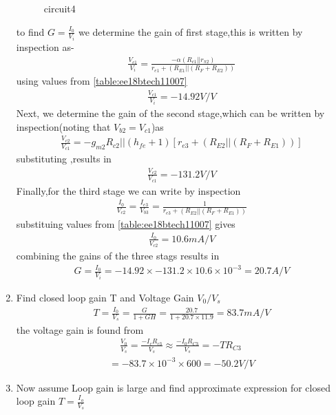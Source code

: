 \begin{enumerate}[label=\thesection.\arabic*.,ref=\thesection.\theenumi]
\begin{figure}[!ht]
\begin{center}
		\resizebox{\columnwidth}{!}{}
	\end{center}
\caption{circuit4}
\label{fig:ee18btech11007_circuit4}
\end{figure}
to find $G=\frac{I_0}{V_i}$ we determine the gain of first stage,this is written by inspection as-
\begin{align}
    \frac{V_{c1}}{V_i}=\frac{-\alpha(R_{c1}||r_{\pi2})}{r_{e1}+(R_{E1}||(R_F+R_{E2}))}
\end{align}
using values from \ref{table:ee18btech11007}
\begin{align}
\frac{V_{c1}}{V_i}=-14.92V/V     
\end{align}
Next, we determine the gain of the second stage,which can be written by inspection(noting that $V_{b2}=V_{c1}$)as
\begin{align}
    \frac{V_{c2}}{V_{c1}}=-g_{m2}{R_{c2}||(h_{fe}+1)[r_{e3}+(R_{E2}||(R_F+R_{E1}))]}
\end{align}
substituting ,results in 
\begin{align}
    \frac{V_{c2}}{V_{c1}}=-131.2 V/V
\end{align}
Finally,for the third stage we can write by inspection
\begin{align}
    \frac{I_0}{V_{c2}}=\frac{I_{e3}}{V_{b3}}=\frac{1}{r_{e3}+(R_{E2}||(R_F+R_{E1}))}
\end{align}
substituing values from \ref{table:ee18btech11007} gives
\begin{align}
    \frac{I_0}{V_{c2}}=10.6mA/V
\end{align}
combining the gains of the three stags results in
\begin{align}
G=\frac{I_0}{V_i}=-14.92\times-131.2\times10.6\times10^{-3}=20.7A/V    
\end{align}
\item Find closed loop gain T and Voltage Gain $V_0/V_s$
\\ \solution
 \begin{align}
 \label{eq:EE18BTECH11007}
    T=\frac{I_0}{V_s}=\frac{G}{1+GH}=\frac{20.7}{1+20.7\times11.9}=83.7mA/V
\end{align}
 the voltage gain is found from 
\begin{align}
    \frac{V_0}{V_s}=\frac{-I_cR_{c3}}{V_s}\approx\frac{-I_0R_{C3}}{V_s}=-TR_{C3}
    \
\end{align}
\begin{align}
    =-83.7\times10^{-3}\times600=-50.2V/V
\end{align}
\item Now assume Loop gain is large and find approximate expression for closed loop gain $T=\frac{I_o}{V_s}$

\end{enumerate}
